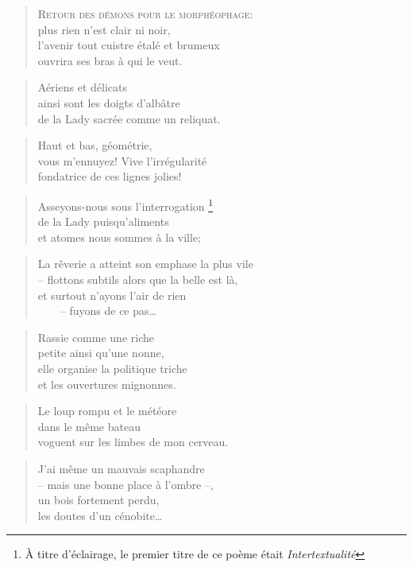   \begin{verse}
    \textsc{Retour des démons pour le morphéophage:}\\
    plus rien n’est clair ni noir,\\
    l’avenir tout cuistre étalé et brumeux\\
    ouvrira ses bras à qui le veut.
  \end{verse}
  \begin{verse}
    Aériens et délicats\\
    ainsi sont les doigts d’albâtre\\
    de la Lady sacrée comme un reliquat.
  \end{verse}
  \begin{verse}
    Haut et bas, géométrie,\\
    vous m’ennuyez! Vive l’irrégularité\\
    fondatrice de ces lignes jolies!
  \end{verse}
  \begin{verse}
    Asseyons-nous sous l’interrogation
    \footnote{À titre d’éclairage, le premier titre de 
    ce poème était \emph{Intertextualité}}\\
    de la Lady puisqu’aliments\\
    et atomes nous sommes à la ville;
  \end{verse}
  \begin{verse}
    La rêverie a atteint son emphase la plus vile\\
    -- flottons subtils alors que la belle est là,\\
    et surtout n’ayons l’air de rien\\
    ~~~~-- fuyons de ce pas…
  \end{verse}
  \begin{verse}
    Rassie comme une riche\\
    petite ainsi qu’une nonne,\\
    elle organise la politique triche\\
    et les ouvertures mignonnes.
  \end{verse}
  \begin{verse}
    Le loup rompu et le météore\\
    dans le même bateau\\
    voguent sur les limbes de mon cerveau.
  \end{verse}
  \begin{verse}
    J’ai même un mauvais scaphandre\\
    -- mais une bonne place à l’ombre --,\\
    un bois fortement perdu,\\
    les doutes d’un cénobite…
  \end{verse}
